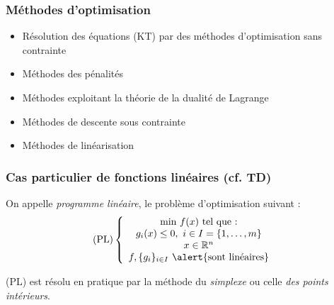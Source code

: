 \documentclass{beamer}
\newcommand{\R}{{\ensuremath\mathbb{R}}}
\begin{document}
\begin{frame}
  \frametitle{Méthodes d'optimisation}

  \begin{itemize}
  \item Résolution des équations (KT) par des méthodes d'optimisation sans contrainte
  \item Méthodes des pénalités
  \item Méthodes exploitant la théorie de la dualité de Lagrange
  \item Méthodes de descente sous contrainte
  \item Méthodes de linéarisation
  \end{itemize}
  
\end{frame}

\begin{frame}
  \frametitle{Cas particulier de fonctions linéaires (cf. TD)}

  On appelle \emph{programme linéaire}, le problème d'optimisation
  suivant : 
  \[
  \text{(PL)} \left\{
  \begin{array}{c}
    \text{min} \ f(x) \ \text{tel que :} \\
    g_i(x) \leq 0, \ i \in I = \{1, \dots, m\} \\
    x \in \R^n \\
    f, \{g_i\}_{i \in I} \ \alert{\text{sont linéaires}} \\
  \end{array}
  \right.
  \]

  (PL) est résolu en pratique par la méthode du \emph{simplexe}
  ou celle \emph{des points intérieurs}.
\end{frame}
\end{document}
